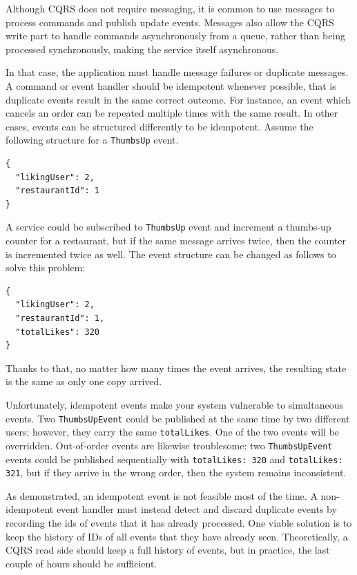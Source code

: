 \documentclass[conference]{IEEEtran}
\begin{document}
Although CQRS does not require messaging, it is common to use messages to process commands and publish update events. Messages also allow the CQRS write part to handle commands asynchronously from a queue, rather than being processed synchronously, making the service itself asynchronous.

In that case, the application must handle message failures or duplicate messages. A command or event handler should be idempotent whenever possible, that is duplicate events result in the same correct outcome. For instance, an event which cancels an order can be repeated multiple times with the same result. In other cases, events can be structured differently to be idempotent. Assume the following structure for a \texttt{ThumbsUp} event.

\begin{lstlisting}
{
  "likingUser": 2,
  "restaurantId": 1
}
\end{lstlisting}

A service could be subscribed to \texttt{ThumbsUp} event and increment a thumbs-up counter for a restaurant, but if the same message arrives twice, then the counter is incremented twice as well. The event structure can be changed as follows to solve this problem:

\begin{lstlisting}
{
  "likingUser": 2,
  "restaurantId": 1,
  "totalLikes": 320
}
\end{lstlisting}

Thanks to that, no matter how many times the event arrives, the resulting state is the same as only one copy arrived.

Unfortunately, idempotent events make your system vulnerable to simultaneous events. Two \texttt{ThumbsUpEvent} could be published at the same time by two different users; however, they carry the same \texttt{totalLikes}. One of the two events will be overridden. Out-of-order events are likewise troublesome: two \texttt{ThumbsUpEvent} events could be published sequentially with \texttt{totalLikes: 320} and \texttt{totalLikes: 321}, but if they arrive in the wrong order, then the system remains inconsistent.

As demonstrated, an idempotent event is not feasible most of the time. A non-idempotent event handler must instead detect and discard duplicate events by recording the ids of events that it has already processed. One viable solution is to keep the history of IDs of all events that they have already seen. Theoretically, a CQRS read side should keep a full history of events, but in practice, the last couple of hours should be sufficient.
\end{document}
